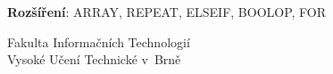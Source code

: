 \begin{titlepage}
\begin{flushleft}
\begin{tabular}{l l l l l}
\end{tabular}
\newline
\newline
\textbf{Rozšíření}: ARRAY, REPEAT, ELSEIF, BOOLOP, FOR
\vfill
\begin{large}
Fakulta Informačních Technologií \\
Vysoké Učení Technické v~Brně \\
\end{large}
\end{flushleft}
\end{titlepage}
